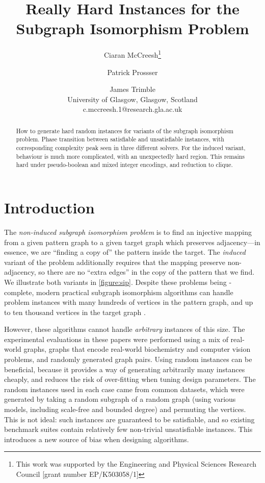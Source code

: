 \documentclass[letterpaper]{article}
\title{Really Hard Instances for the Subgraph Isomorphism Problem}
\author{Ciaran McCreesh\thanks{This work was supported by the Engineering and Physical Sciences
    Research Council [grant number EP/K503058/1]} \and Patrick Prossser \and James Trimble \\
University of Glasgow, Glasgow, Scotland \\
c.mccreesh.1@research.gla.ac.uk}
\begin{document}
\maketitle

\begin{abstract}
    How to generate hard random instances for variants of the subgraph isomorphism problem. Phase
    transition between satisfiable and unsatisfiable instances, with corresponding complexity peak
    seen in three different solvers. For the induced variant, behaviour is much more complicated,
    with an unexpectedly hard region. This remains hard under pseudo-boolean and mixed integer
    encodings, and reduction to clique.
\end{abstract}

\section{Introduction}

The \emph{non-induced subgraph isomorphism problem} is to find an injective mapping from a given
pattern graph to a given target graph which preserves adjacency---in essence, we are ``finding a
copy of'' the pattern inside the target. The \emph{induced} variant of the problem additionally
requires that the mapping preserve non-adjacency, so there are no ``extra edges'' in the copy of the
pattern that we find. We illustrate both variants in \cref{figure:sip}.
Despite these problems being \NP-complete, modern practical subgraph isomorphism algorithms can
handle problem instances with many hundreds of vertices in the pattern graph, and up to ten thousand
vertices in the target graph \citep{Cordella:2004,Solnon:2010,Audemard:2014,McCreesh:2015}.

However, these algorithms cannot handle \emph{arbitrary} instances of this size. The experimental
evaluations in these papers were performed using a mix of real-world graphs, graphs that encode
real-world biochemistry and computer vision problems, and randomly generated graph pairs. Using
random instances can be beneficial, because it provides a way of generating arbitrarily
many instances cheaply, and reduces the risk of over-fitting when tuning design parameters. The
random instances used in each case came from common datasets, which were generated by taking a random
subgraph of a random graph (using various models, including scale-free and bounded degree) and
permuting the vertices.  This is not ideal: such instances are guaranteed to be satisfiable, and so
existing benchmark suites contain relatively few non-trivial unsatisfiable instances. This
introduces a new source of bias when designing algorithms.
\end{document}
